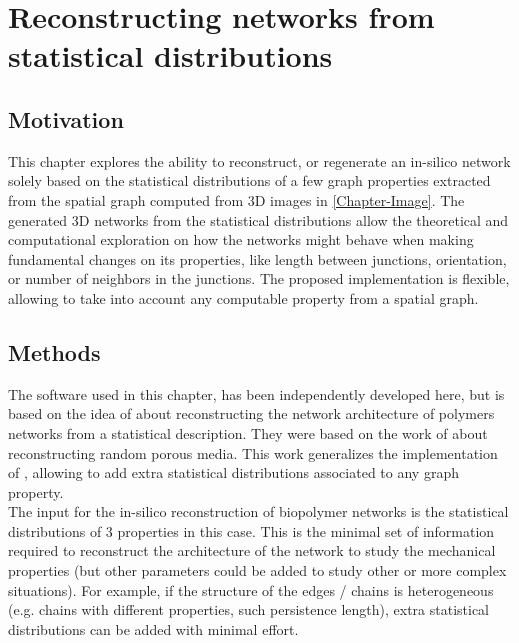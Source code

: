 
\chapter{Reconstructing networks from statistical distributions} %

\label{Chapter-Reconstruction} %


\section{Motivation}
\label{sec:motivation-reconstruction}
This chapter explores the ability to reconstruct, or regenerate an in-silico network solely based on the statistical distributions of a few graph properties extracted from the spatial graph computed from 3D images in \autoref{Chapter-Image}.
The generated 3D networks from the statistical distributions allow the theoretical and computational exploration on how the networks might behave when making fundamental changes on its properties, like length between junctions, orientation, or number of neighbors in the junctions.
The proposed implementation is flexible, allowing to take into account any computable property from a spatial graph.

\section{Methods}

The software used in this chapter, has been independently developed here, but is based on the
idea of \citet{lindstrom_biopolymer_2010} about reconstructing the network
architecture of polymers networks from a statistical description. They were
based on the work of \citet{yeong_reconstructing_1998,yeong_reconstructing_1998-1}
about reconstructing random porous media. This work generalizes the implementation of \citet{lindstrom_biopolymer_2010}, allowing to add extra statistical distributions associated to any graph property.\\
The input for the in-silico reconstruction of biopolymer networks is the
statistical distributions of $3$ properties in this case. This is the minimal
set of information required to reconstruct the architecture of the network to study the
mechanical properties (but other parameters could be added to study other or
more complex situations). For example, if the structure of the edges / chains is
heterogeneous (e.g. chains with different properties, such persistence length), extra
statistical distributions can be added with minimal effort.

